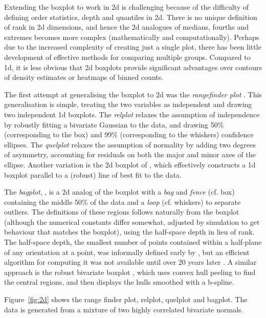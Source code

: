 \documentclass[oneside]{article}
\begin{document}
Extending the boxplot to work in 2d is challenging because of the difficulty of defining order statistics, depth and quantiles in 2d. There is no unique definition of rank in 2d dimensions, and hence the 2d analogues of medians, fourths and extremes becomes more complex (mathematically and computationally). Perhaps due to the increased complexity of creating just a single plot, there has been little development of effective methods for comparing multiple groups. Compared to 1d, it is less obvious that 2d boxplots provide significant advantages over contours of density estimates or heatmaps of binned counts.

The first attempt at generalising the boxplot to 2d was the \emph{rangefinder plot} \citep{becketti:1987}. This generalisation is simple, treating the two variables as independent and drawing two independent 1d boxplots. The \emph{relplot} \citep{goldberg:1992} relaxes the assumption of independence by robustly fitting a bivariate Gaussian to the data, and drawing 50\% (corresponding to the box) and 99\% (corresponding to the whiskers) confidence ellipses. The \emph{quelplot}\citep{goldberg:1992} relaxes the assumption of normality by adding two degrees of asymmetry, accounting for residuals on both the major and minor axes of the ellipse. Another variation is the 2d boxplot of \citet{tongkumchum:2005}, which effectively constructs a 1d boxplot parallel to a (robust) line of best fit to the data.

The \emph{bagplot}, \citep{rousseuw:1999}, is a 2d analog of the boxplot with a \emph{bag} and \emph{fence} (cf. box) containing the middle 50\% of the data and a \emph{loop} (cf. whiskers) to separate outliers. The definitions of these regions follows naturally from the boxplot (although the numerical constants differ somewhat, adjusted by simulation to get behaviour that matches the boxplot), using the half-space depth in lieu of rank. The half-space depth, the smallest number of points contained within a half-plane of any orientation at a point, was informally defined early by \citet{tukey:1975}, but an efficient algorithm for computing it was not available until over 20 years later \citep{rousseeuw:1996}. A similar approach is the robust bivariate boxplot \citep{zani:1998}, which uses convex hull peeling to find the central regions, and then displays the hulls smoothed with a b-spline.

Figure~\ref{fig:2d} shows the range finder plot, relplot, quelplot and bagplot. The data is generated from a mixture of two highly correlated bivariate normals.
\end{document}
